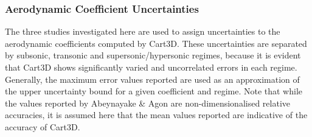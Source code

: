 \subsubsection{Aerodynamic Coefficient Uncertainties}
The three studies investigated here are used to assign uncertainties to the aerodynamic coefficients computed by Cart3D. These uncertainties are separated by subsonic, transonic and supersonic/hypersonic regimes, because it is evident that Cart3D shows significantly varied and uncorrelated errors in each regime. Generally, the maximum error values reported are used as an approximation of the upper uncertainty bound for a given coefficient and regime. 
  Note that while the values reported by Abeynayake \& Agon\cite{Abeynayake2013a} are non-dimensionalised relative accuracies, it is assumed here that the mean values reported are indicative of the accuracy of Cart3D. 
  
